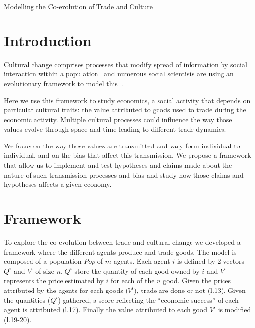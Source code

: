 \documentclass{article}
\author{Simon Carrignon}
\begin{document}
	Modelling the Co-evolution of Trade and Culture 

\section{Introduction}
Cultural change comprises  processes that modify spread of information by social interaction within a population~\cite{boyd_origin_2005}  and numerous social scientists are using an evolutionary framework to model this~\cite{henrich_evolution_2003}.

Here we use this framework to study economics, a social activity that depends on particular cultural traits: the value attributed to goods used to trade during the economic activity. Multiple cultural processes could influence the way those values evolve through space and time leading to different trade dynamics.

We focus on the way those values are transmitted and vary form individual to individual, and on the bias that affect this transmission. We propose a framework that allow us to implement and test hypotheses and claims made about the nature of such transmission processes and bias and study how those claims and hypotheses affects a given economy.

\section{Framework}

To explore the co-evolution between trade and cultural change we developed a framework where the different agents produce and trade goods. The model is composed of a population $Pop$ of $m$ agents. Each agent $i$ is defined by 2 vectors $Q^i$ and $V^i$ of size $n$. $Q^i$ store the quantity of each good owned by $i$ and $V^i$ represents the price estimated by $i$ for each of the $n$ good.
%
Given the prices attributed by the agents for each goods ($V^i$), trade are done or not (l.13). Given the quantities ($Q^i$) gathered, a score reflecting the ``economic success'' of each agent is attributed (l.17). Finally the value attributed to each good $V^i$ is modified (l.19-20).
\end{document}

